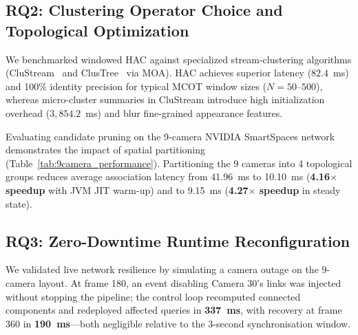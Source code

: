 \documentclass[conference]{IEEEtran}
\begin{document}
\subsection{RQ2: Clustering Operator Choice and Topological Optimization}
We benchmarked windowed HAC against specialized stream-clustering algorithms (CluStream~\cite{aggarwal2003framework} and ClusTree~\cite{kranen2011clustree} via MOA). HAC achieves superior latency ($82.4$~ms) and 100\% identity precision for typical MCOT window sizes ($N=50$--$500$), whereas micro-cluster summaries in CluStream introduce high initialization overhead ($3,854.2$~ms) and blur fine-grained appearance features.

Evaluating candidate pruning on the 9-camera NVIDIA SmartSpaces network demonstrates the impact of spatial partitioning (Table~\ref{tab:9camera_performance}). Partitioning the 9 cameras into 4 topological groups reduces average association latency from 41.96~ms to 10.10~ms (\textbf{4.16$\times$ speedup} with JVM JIT warm-up) and to 9.15~ms (\textbf{4.27$\times$ speedup} in steady state).

\begin{table}[t!]
\centering
\caption{Topological Optimization Impact (NVIDIA SmartSpaces, 10 Runs)}
\label{tab:9camera_performance}
\end{table}

\subsection{RQ3: Zero-Downtime Runtime Reconfiguration}
We validated live network resilience by simulating a camera outage on the 9-camera layout. At frame 180, an event disabling Camera 30's links was injected without stopping the pipeline; the control loop recomputed connected components and redeployed affected queries in \textbf{337~ms}, with recovery at frame 360 in \textbf{190~ms}---both negligible relative to the 3-second synchronisation window.
\end{document}

